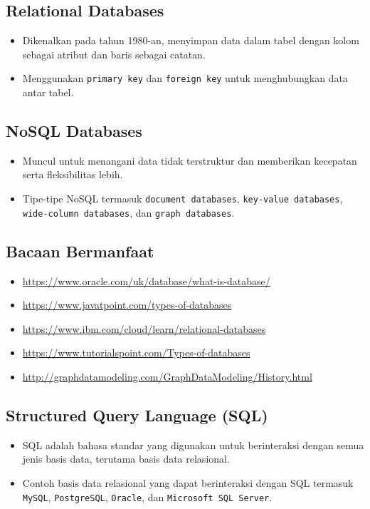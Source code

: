 \documentclass{article}
\begin{document}
\subsection{Relational Databases}
\begin{itemize}
    \item Dikenalkan pada tahun 1980-an, menyimpan data dalam tabel dengan kolom sebagai atribut dan baris sebagai catatan.
    \item Menggunakan \texttt{primary key} dan \texttt{foreign key} untuk menghubungkan data antar tabel.
\end{itemize}

\subsection{NoSQL Databases}
\begin{itemize}
    \item Muncul untuk menangani data tidak terstruktur dan memberikan kecepatan serta fleksibilitas lebih.
    \item Tipe-tipe NoSQL termasuk \texttt{document databases}, \texttt{key-value databases}, \texttt{wide-column databases}, dan \texttt{graph databases}.
\end{itemize}

\subsection{Bacaan Bermanfaat}
\begin{itemize}
    \item \url{https://www.oracle.com/uk/database/what-is-database/}
    \item \url{https://www.javatpoint.com/types-of-databases}
    \item \url{https://www.ibm.com/cloud/learn/relational-databases}
    \item \url{https://www.tutorialspoint.com/Types-of-databases}
    \item \url{http://graphdatamodeling.com/GraphDataModeling/History.html}
\end{itemize}

\subsection{Structured Query Language (SQL)}
\begin{itemize}
    \item SQL adalah bahasa standar yang digunakan untuk berinteraksi dengan semua jenis basis data, terutama basis data relasional.
    \item Contoh basis data relasional yang dapat berinteraksi dengan SQL termasuk \texttt{MySQL}, \texttt{PostgreSQL}, \texttt{Oracle}, dan \texttt{Microsoft SQL Server}.
\end{itemize}
\end{document}
